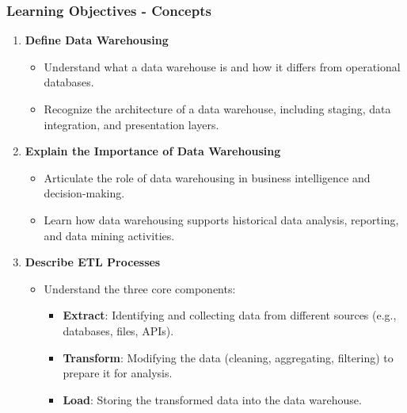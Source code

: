 \documentclass{beamer}
\begin{document}
\begin{frame}[fragile]
    \frametitle{Learning Objectives - Concepts}
    \begin{enumerate}
        \item \textbf{Define Data Warehousing}  
        \begin{itemize}
            \item Understand what a data warehouse is and how it differs from operational databases.  
            \item Recognize the architecture of a data warehouse, including staging, data integration, and presentation layers.
        \end{itemize}
        
        \item \textbf{Explain the Importance of Data Warehousing}  
        \begin{itemize}
            \item Articulate the role of data warehousing in business intelligence and decision-making.  
            \item Learn how data warehousing supports historical data analysis, reporting, and data mining activities.
        \end{itemize}

        \item \textbf{Describe ETL Processes}  
        \begin{itemize}
            \item Understand the three core components:  
            \begin{itemize}
                \item \textbf{Extract}: Identifying and collecting data from different sources (e.g., databases, files, APIs).  
                \item \textbf{Transform}: Modifying the data (cleaning, aggregating, filtering) to prepare it for analysis.  
                \item \textbf{Load}: Storing the transformed data into the data warehouse.  
            \end{itemize}
        \end{itemize}
    \end{enumerate}
\end{frame}
\end{document}
